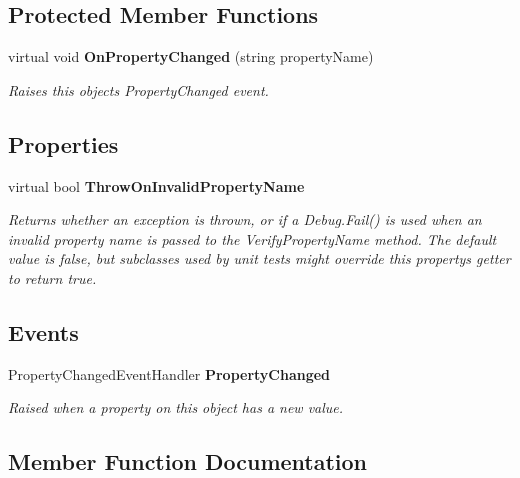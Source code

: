 \subsection*{Protected Member Functions}
\begin{DoxyCompactItemize}
\item 
virtual void \textbf{ On\+Property\+Changed} (string property\+Name)
\begin{DoxyCompactList}\small\item\em Raises this object\textquotesingle{}s Property\+Changed event. \end{DoxyCompactList}\end{DoxyCompactItemize}
\subsection*{Properties}
\begin{DoxyCompactItemize}
\item 
virtual bool \textbf{ Throw\+On\+Invalid\+Property\+Name}\hspace{0.3cm}{\ttfamily  [get]}
\begin{DoxyCompactList}\small\item\em Returns whether an exception is thrown, or if a Debug.\+Fail() is used when an invalid property name is passed to the Verify\+Property\+Name method. The default value is false, but subclasses used by unit tests might override this property\textquotesingle{}s getter to return true. \end{DoxyCompactList}\end{DoxyCompactItemize}
\subsection*{Events}
\begin{DoxyCompactItemize}
\item 
Property\+Changed\+Event\+Handler \textbf{ Property\+Changed}
\begin{DoxyCompactList}\small\item\em Raised when a property on this object has a new value. \end{DoxyCompactList}\end{DoxyCompactItemize}


\subsection{Member Function Documentation}
\mbox{\label{class_a_f_h___scheduler_1_1_helper___classes_1_1_observable_object_a49d86e90da59bd87569515e20a83766a}} 
